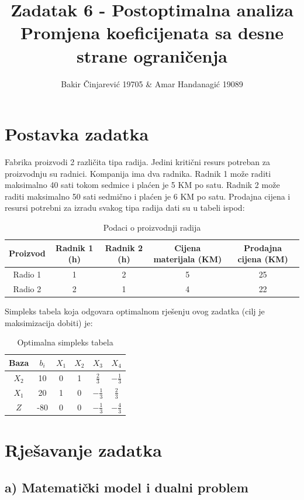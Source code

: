 \documentclass[12pt,a4paper]{article}
\title{\textbf{Zadatak 6 - Postoptimalna analiza} \\ 
\large Promjena koeficijenata sa desne strane ograničenja}
\author{Bakir Činjarević 19705 \& Amar Handanagić 19089}
\date{}
\begin{document}
\maketitle

\section{Postavka zadatka}

Fabrika proizvodi 2 različita tipa radija. Jedini kritični resurs potreban za proizvodnju su radnici. Kompanija ima dva radnika. Radnik 1 može raditi maksimalno 40 sati tokom sedmice i plaćen je 5 KM po satu. Radnik 2 može raditi maksimalno 50 sati sedmično i plaćen je 6 KM po satu. Prodajna cijena i resursi potrebni za izradu svakog tipa radija dati su u tabeli ispod:

\begin{table}[H]
\centering
\begin{tabular}{|c|c|c|c|c|}
\hline
Proizvod & Radnik 1 (h) & Radnik 2 (h) & Cijena materijala (KM) & Prodajna cijena (KM) \\
\hline
Radio 1 & 1 & 2 & 5 & 25 \\
\hline
Radio 2 & 2 & 1 & 4 & 22 \\
\hline
\end{tabular}
\caption{Podaci o proizvodnji radija}
\end{table}

Simpleks tabela koja odgovara optimalnom rješenju ovog zadatka (cilj je maksimizacija dobiti) je:

\begin{table}[H]
\centering
\begin{tabular}{|c|c|c|c|c|c|}
\hline
Baza & $b_i$ & $X_1$ & $X_2$ & $X_3$ & $X_4$ \\
\hline
$X_2$ & 10 & 0 & 1 & $\frac{2}{3}$ & $-\frac{1}{3}$ \\
\hline
$X_1$ & 20 & 1 & 0 & $-\frac{1}{3}$ & $\frac{2}{3}$ \\
\hline
$Z$ & -80 & 0 & 0 & $-\frac{1}{3}$ & $-\frac{4}{3}$ \\
\hline
\end{tabular}
\caption{Optimalna simpleks tabela}
\end{table}

\section{Rješavanje zadatka}

\subsection{a) Matematički model i dualni problem}
\end{document}
